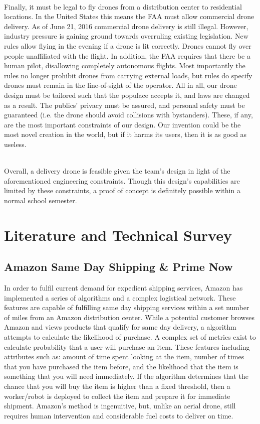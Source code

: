 \documentclass[12pt]{extarticle}
\begin{document}
\ \\
Finally, it must be legal to fly drones from a distribution center to residential locations. In the United States this means the FAA must allow commercial drone delivery. As of June 21, 2016 commercial drone delivery is still illegal.  However, industry pressure is gaining ground towards overruling existing legislation.  New rules allow flying in the evening if a drone is lit correctly.  Drones cannot fly over people unaffiliated with the flight.  In addition, the FAA requires that there be a human pilot, disallowing completely autonomous flights.  Most importantly the rules no longer prohibit drones from carrying external loads, but rules do specify drones must remain in the line-of-sight of the operator.  All in all, our drone design must be tailored such that the populace accepts it, and laws are changed as a result.  The publics' privacy must be assured, and personal safety must be guaranteed (i.e. the drone should avoid collisions with bystanders).  These, if any, are the most important constraints of our design.  Our invention could be the most novel creation in the world, but if it harms its users, then it is as good as useless. 

\ \\
Overall, a delivery drone is feasible given the team's design in light of the aforementioned engineering constraints. Though this design's capabilities are limited by these constraints, a proof of concept is definitely possible within a normal school semester.  

\section{Literature and Technical Survey}

\subsection{Amazon Same Day Shipping \& Prime Now}

In order to fulfil current demand for expedient shipping services, Amazon has implemented a series of algorithms and a complex logistical network.  These features are capable of fulfilling same day shipping services within a set number of miles from an Amazon distribution center. While a potential customer browses Amazon and views products that qualify for same day delivery, a algorithm attempts to calculate the likelihood of purchase.  A complex set of metrics exist to calculate probability that a user will purchase an item.  These features including attributes such as: amount of time spent looking at the item, number of times that you have purchased the item before, and the likelihood that the item is something that you will need immediately.  If the algorithm determines that the chance that you will buy the item is higher than a fixed threshold, then a worker/robot is deployed to collect the item and prepare it for immediate shipment.  Amazon's method is ingenuitive, but, unlike an aerial drone, still requires human intervention and considerable fuel costs to deliver on time.  
\end{document}
